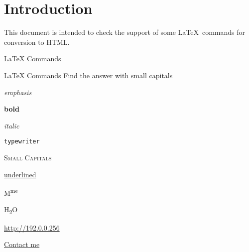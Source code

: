 \documentclass{article}
\begin{document}
\section*{Introduction}

This document is intended to check the support of some \LaTeX\ commands for 
conversion to HTML.

\begin{quiz}[points=1]{LaTeX Commands}
\begin{multi}{LaTeX Commands}
Find the answer with small capitals
\item \emph{emphasis}
\item \textbf{bold}
\item \textit{italic}
\item \texttt{typewriter}
\item* \textsc{Small Capitals}
\item \underline{underlined}
\item M\textsuperscript{me}
\item H\textsubscript{2}O
\item \url{http://192.0.0.256}
\item \href{mailto:name@server.com}{Contact me}
\end{multi}

\end{quiz}
\end{document}
